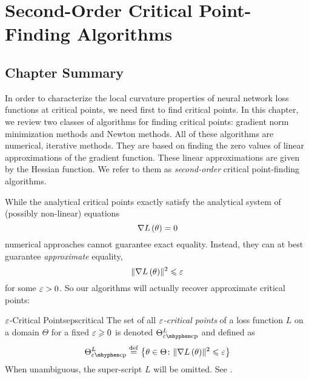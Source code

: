 \documentclass[../../thesis.tex]{subfiles}
\begin{document}
\chapter{%
Second-Order Critical Point-Finding Algorithms
}
\onlyinsubfile{\begin{KeepFromToc}
		\tableofcontents
		\listoffigures
		\listofalgorithms{}
	\end{KeepFromToc}}
\onlyinsubfile{\clearpage}
\onlyinsubfile{\linenumbers}

\section{Chapter Summary}

In order to characterize the local curvature properties
of neural network loss functions at critical points,
we need first to find critical points.
In this chapter,
we review two classes of algorithms for finding critical points:
gradient norm minimization methods
and Newton methods.
All of these algorithms are
numerical, iterative methods.
They are based on finding the zero values of linear approximations
of the gradient function.
These linear approximations are given by the Hessian function.
We refer to them as \emph{second-order}
critical point-finding algorithms.

While the analytical critical points exactly satisfy
the analytical system of (possibly non-linear) equations
\begin{equation}\equationlabel{gradienteqns}
	\grad{L}{\theta} = 0
\end{equation}
\noindent numerical approaches cannot guarantee
exact equality.
Instead, they can at best guarantee \emph{approximate} equality,
\begin{equation}\equationlabel{gradienteps}
	\sgn{L}{\theta} \leq \eps
\end{equation}
\noindent for some $\varepsilon > 0$.
So our algorithms will actually recover approximate critical points:

\begin{definition}{$\varepsilon$-Critical Points}{epscritical}
	The set of all \emph{$\varepsilon$-critical points} of a loss function $L$
	on a domain $\Theta$ for a fixed $\varepsilon\geqslant0$ is denoted $\Theta^L_{\ecp}$
	and defined as
	\begin{equation}\equationlabel{def-epscp}
		\Theta^L_{\ecp} \defeq
		\Set{\theta \in \Theta \suchthat \sgn{L}{\theta} \leq \eps}
	\end{equation}
	When unambiguous, the super-script $L$ will be omitted.
	See .
\end{definition}
\end{document}
